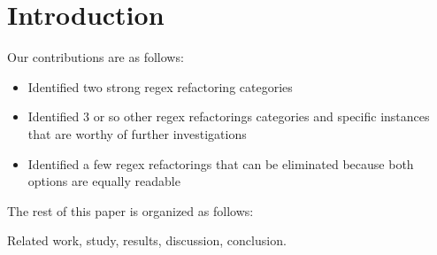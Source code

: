 \section{Introduction }

Our contributions are as follows:
\begin{itemize}
\item {Identified two strong regex refactoring categories}
\item {Identified 3 or so other regex refactorings categories and specific instances that are worthy of further investigations}
\item {Identified a few regex refactorings that can be eliminated because both options are equally readable}
\end{itemize}

The rest of this paper is organized as follows:

Related work, study, results, discussion, conclusion.
